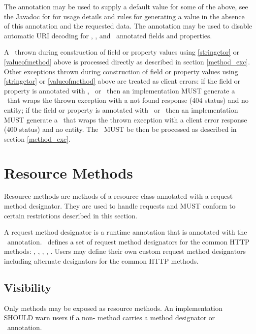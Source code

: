 The  annotation may be used to supply a default value for some of the above, see the Javadoc for  for usage details and rules for generating a value in the absence of this annotation and the requested data. The  annotation may be used to disable automatic URI decoding for \MatrixParam, \QueryParam, and \PathParam\ annotated fields and properties.

A \WebAppExc\ thrown during construction of field or property values using \ref{stringctor} or \ref{valueofmethod} above is processed directly as described in section \ref{method_exc}. Other exceptions thrown during construction of field or property values using \ref{stringctor} or \ref{valueofmethod} above are treated as client errors: if the field or property is annotated with \MatrixParam, \QueryParam\ or \PathParam\ then an implementation MUST generate a \WebAppExc\ that wraps the thrown exception with a not found response (404 status) and no entity; if the field or property is annotated with \HeaderParam\ or \CookieParam\ then an implementation MUST generate a \WebAppExc\ that wraps the thrown exception with  a client error response (400 status) and no entity. The \WebAppExc\ MUST be then be processed as described in section \ref{method_exc}.

\section{Resource Methods}
\label{resource_method}

Resource methods are methods of a resource class annotated with a request method designator. They are used to handle requests and MUST conform to certain restrictions described in this section.

A request method designator is a runtime annotation that is annotated with the \HttpMethod\ annotation. \jaxrs\ defines a set of request method designators for the common HTTP methods: , , , , . Users may define their own custom request method designators including alternate designators for the common HTTP methods.

\subsection{Visibility}

Only  methods may be exposed as resource methods. An implementation SHOULD warn users if a non- method carries a method designator or \Path\ annotation.

